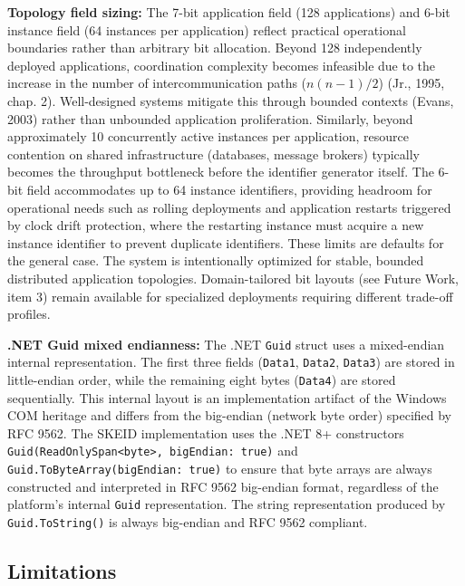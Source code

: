 \documentclass[fleqn,10pt]{wlpeerj}
\begin{document}
\textbf{Topology field sizing:} The 7-bit application field (128
applications) and 6-bit instance field (64 instances per application)
reflect practical operational boundaries rather than arbitrary bit
allocation. Beyond 128 independently deployed applications, coordination
complexity becomes infeasible due to the increase in the number of
intercommunication paths (\(n(n-1)/2\)) (Jr., 1995, chap. 2).
Well-designed systems mitigate this through bounded contexts (Evans,
2003) rather than unbounded application proliferation. Similarly, beyond
approximately 10 concurrently active instances per application, resource
contention on shared infrastructure (databases, message brokers)
typically becomes the throughput bottleneck before the identifier
generator itself. The 6-bit field accommodates up to 64 instance
identifiers, providing headroom for operational needs such as rolling
deployments and application restarts triggered by clock drift
protection, where the restarting instance must acquire a new instance
identifier to prevent duplicate identifiers. These limits are defaults
for the general case. The system is intentionally optimized for stable,
bounded distributed application topologies. Domain-tailored bit layouts
(see Future Work, item 3) remain available for specialized deployments
requiring different trade-off profiles.

\textbf{.NET Guid mixed endianness:} The .NET \texttt{Guid} struct uses
a mixed-endian internal representation. The first three fields
(\texttt{Data1}, \texttt{Data2}, \texttt{Data3}) are stored in
little-endian order, while the remaining eight bytes (\texttt{Data4})
are stored sequentially. This internal layout is an implementation
artifact of the Windows COM heritage and differs from the big-endian
(network byte order) specified by RFC 9562. The SKEID implementation
uses the .NET 8+ constructors
\texttt{Guid(ReadOnlySpan\textless{}byte\textgreater{},\ bigEndian:\ true)}
and \texttt{Guid.ToByteArray(bigEndian:\ true)} to ensure that byte
arrays are always constructed and interpreted in RFC 9562 big-endian
format, regardless of the platform's internal \texttt{Guid}
representation. The string representation produced by
\texttt{Guid.ToString()} is always big-endian and RFC 9562 compliant.

\subsection{Limitations}\label{limitations}
\end{document}
